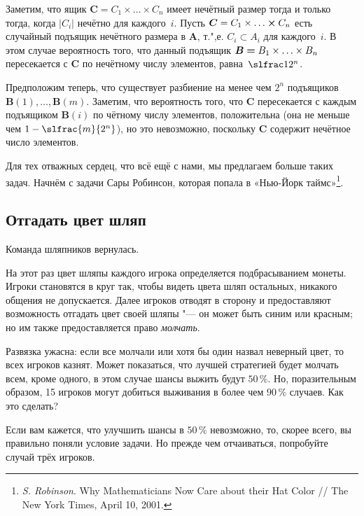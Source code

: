 \documentclass[twoside]{book}
\makeatletter
\newcommand{\rindex}[2][\imki@jobname]{%
  \index[#1]{\detokenize{#2}}%
}
\makeatother
\begin{document}
Заметим, что ящик $\bm{C}=C_1 \times\ldots\times C_n$ имеет нечётный размер тогда и только тогда, когда $|C_i|$ нечётно для каждого~$i$.
Пусть $\bm{C}=C_1 \times \ldots \hm\times C_n$ есть случайный подъящик нечётного размера в $\bm{A}$, т.",е. $C_i\subset A_i$ для каждого~$i$.
В этом случае вероятность того, что данный подъящик $\bm{B}\hm=B_1\times\ldots\times B_n$ пересекается с $\bm{C}$ по нечётному числу элементов, равна~$\slfrac1{2^n}$.

Предположим теперь, что существует разбиение на менее чем $2^n$ подъящиков $\bm{B}(1),\dots,\bm{B}(m)$.
Заметим, что вероятность того, что $\bm{C}$ пересекается с каждым подъящиком $\bm{B}(i)$ по чётному числу элементов, положительна (она не меньше чем $1-\slfrac{m}{2^n}$),
но это невозможно, поскольку $\bm{C}$ содержит нечётное число элементов.
\heart

Для тех отважных сердец, что всё ещё с нами, мы предлагаем больше таких задач.
Начнём с задачи Сары Робинсон, которая попала в «Нью-Йорк таймс»\footnote{\emph{S. Robinson}. Why Mathematicians Now Care about their Hat Color /\!/ {The New York Times}, April 10, 2001.}.

\subsection*{Отгадать цвет шляп}
\rindex{Отгадать цвет шляп}

Команда шляпников вернулась.

На этот раз цвет шляпы каждого игрока определяется подбрасыванием монеты.
Игроки становятся в круг так, чтобы видеть цвета шляп остальных, никакого общения не допускается.
Далее игроков отводят в сторону и предоставляют возможность отгадать цвет своей шляпы "--- он может быть синим или красным;
но им также предоставляется право \emph{молчать}.

Развязка ужасна: если все молчали или хотя бы один назвал неверный цвет, то всех игроков казнят.
Может показаться, что лучшей стратегией будет молчать всем, кроме одного, в этом случае шансы выжить будут $50\,\%$.
Но, поразительным образом, 15 %
игроков могут добиться выживания в более чем $90\,\%$ случаев. 
Как это сделать?

Если вам кажется, что улучшить шансы в $50\,\%$ невозможно, то, скорее всего, вы правильно поняли условие задачи.
Но прежде чем отчаиваться, попробуйте случай трёх игроков.

\medskip 
\end{document}
